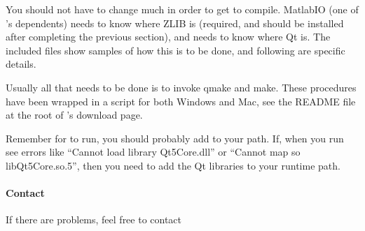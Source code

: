 You should not have to change much in order to get \map{} to compile.
MatlabIO (one of \map{}'s dependents) needs to know where ZLIB is
(required, and should be installed after completing the previous section),
and \map{} needs to know where Qt is.  The included files show samples of
how this is to be done, and following are specific details.

Usually all that needs to be done is to invoke qmake and make. These procedures
have been wrapped in a script for both Windows and Mac, see the README file at
the root of \map{}'s download page.


Remember for \map{} to run, you should probably add \map{} to your path.
If, when you run \map{} see errors like ``Cannot load library Qt5Core.dll''
or ``Cannot map so libQt5Core.so.5'', then you need to add the Qt libraries
to your runtime path.

\paragraph{Contact}
If there are problems, feel free to contact

